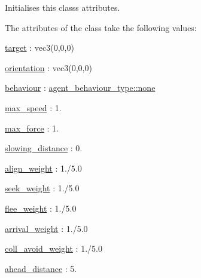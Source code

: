 Initialises this class\textquotesingle{}s attributes. 

The attributes of the class take the following values\+:
\begin{DoxyItemize}
\item \hyperlink{classphysim_1_1particles_1_1agent__particle_a0658207e11a5d39844856233ae8bf2cb}{target} \+: vec3(0,0,0)
\item \hyperlink{classphysim_1_1particles_1_1agent__particle_a87b2554699454e6850f1d2b48e278f63}{orientation} \+: vec3(0,0,0)
\item \hyperlink{classphysim_1_1particles_1_1agent__particle_af219e3f46630bb7f51f3d00952ed4f1c}{behaviour} \+: \hyperlink{namespacephysim_1_1particles_a033757595f7862a0fc8a389d79bf9c88a334c4a4c42fdb79d7ebc3e73b517e6f8}{agent\+\_\+behaviour\+\_\+type\+::none}
\item \hyperlink{classphysim_1_1particles_1_1agent__particle_a3e34a9a7fc82cbad0226b7b925b5ba22}{max\+\_\+speed} \+: 1.
\item \hyperlink{classphysim_1_1particles_1_1agent__particle_a57909cb85564f4432754000ed570d88a}{max\+\_\+force} \+: 1.
\item \hyperlink{classphysim_1_1particles_1_1agent__particle_a1c3e4357a84047b45ea827a2e90cd14b}{slowing\+\_\+distance} \+: 0.
\item \hyperlink{classphysim_1_1particles_1_1agent__particle_a119da4916df4f5c52f13170725295f20}{align\+\_\+weight} \+: 1./5.0
\item \hyperlink{classphysim_1_1particles_1_1agent__particle_a853c72c7dbd902a126af1a90d50af222}{seek\+\_\+weight} \+: 1./5.0
\item \hyperlink{classphysim_1_1particles_1_1agent__particle_ad7824cd0742b42f803542d8b4d5eae98}{flee\+\_\+weight} \+: 1./5.0
\item \hyperlink{classphysim_1_1particles_1_1agent__particle_aaeb579f8b30b7604d7205bb7aff5197b}{arrival\+\_\+weight} \+: 1./5.0
\item \hyperlink{classphysim_1_1particles_1_1agent__particle_acf2c406d0b41c07d3f786701dec35020}{coll\+\_\+avoid\+\_\+weight} \+: 1./5.0
\item \hyperlink{classphysim_1_1particles_1_1agent__particle_ab08a6b3f3a8f27b3281d981146135234}{ahead\+\_\+distance} \+: 5. 
\end{DoxyItemize}\mbox{\label{classphysim_1_1particles_1_1agent__particle_ac4eabcfb94d1c5769415f8822556be8b}} 

